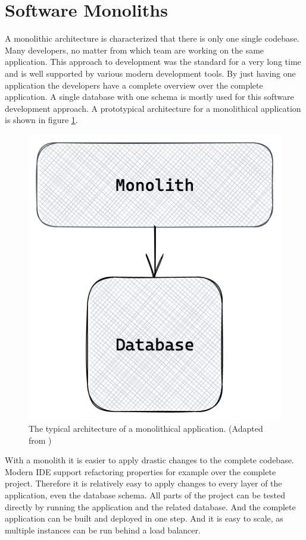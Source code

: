 \section{Software Monoliths}\label{section:background:software-monolith}

A monolithic architecture is characterized that there is only one single codebase. Many developers, no matter from which team are working on the same application. This approach to development was the standard for a very long time and is well supported by various modern development tools. By just having one application the developers have a complete overview over the complete application. A single database with one schema is mostly used for this software development approach. A prototypical architecture for a monolithical application is shown in figure \ref{fig:background:monolith:monolith-sketch}.

\ifshowImages
\begin{figure}[H]
    \centering
    \includegraphics[width=0.3\linewidth]{images/background/monolith/monolith-sketch.png}
    \caption{The typical architecture of a monolithical application. (Adapted from \cite[12]{book:2019:newman:background:monolith:monolith-to-microservices})}\label{fig:background:monolith:monolith-sketch}
\end{figure}
\fi

\bigskip

\noindent With a monolith it is easier to apply drastic changes to the complete codebase. Modern IDE support refactoring properties for example over the complete project. Therefore it is relatively easy to apply changes to every layer of the application, even the database schema. All parts of the project can be tested directly by running the application and the related database. And the complete application can be built and deployed in one step. And it is easy to scale, as multiple instances can be run behind a load balancer. \cite[4]{book:2018:richardson:background:bff:microservices-patterns}

\bigskip

